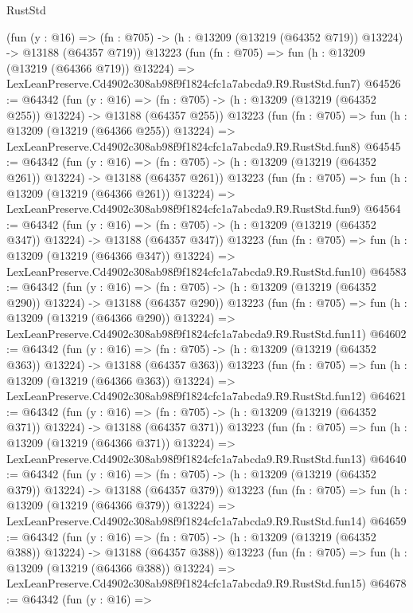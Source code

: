 \begin{lexlean}{RustStd}
\begin{coremodule}
    (fun (y : @16) =>
    (fn : @705) -> (h : @13209 (@13219 (@64352 @719)) @13224) -> @13188 (@64357 @719))
    @13223
    (fun (fn : @705) =>
    fun (h : @13209 (@13219 (@64366 @719)) @13224) =>
    LexLeanPreserve.Cd4902c308ab98f9f1824cfc1a7abcda9.R9.RustStd.fun7)
@64526 := @64342
    (fun (y : @16) =>
    (fn : @705) -> (h : @13209 (@13219 (@64352 @255)) @13224) -> @13188 (@64357 @255))
    @13223
    (fun (fn : @705) =>
    fun (h : @13209 (@13219 (@64366 @255)) @13224) =>
    LexLeanPreserve.Cd4902c308ab98f9f1824cfc1a7abcda9.R9.RustStd.fun8)
@64545 := @64342
    (fun (y : @16) =>
    (fn : @705) -> (h : @13209 (@13219 (@64352 @261)) @13224) -> @13188 (@64357 @261))
    @13223
    (fun (fn : @705) =>
    fun (h : @13209 (@13219 (@64366 @261)) @13224) =>
    LexLeanPreserve.Cd4902c308ab98f9f1824cfc1a7abcda9.R9.RustStd.fun9)
@64564 := @64342
    (fun (y : @16) =>
    (fn : @705) -> (h : @13209 (@13219 (@64352 @347)) @13224) -> @13188 (@64357 @347))
    @13223
    (fun (fn : @705) =>
    fun (h : @13209 (@13219 (@64366 @347)) @13224) =>
    LexLeanPreserve.Cd4902c308ab98f9f1824cfc1a7abcda9.R9.RustStd.fun10)
@64583 := @64342
    (fun (y : @16) =>
    (fn : @705) -> (h : @13209 (@13219 (@64352 @290)) @13224) -> @13188 (@64357 @290))
    @13223
    (fun (fn : @705) =>
    fun (h : @13209 (@13219 (@64366 @290)) @13224) =>
    LexLeanPreserve.Cd4902c308ab98f9f1824cfc1a7abcda9.R9.RustStd.fun11)
@64602 := @64342
    (fun (y : @16) =>
    (fn : @705) -> (h : @13209 (@13219 (@64352 @363)) @13224) -> @13188 (@64357 @363))
    @13223
    (fun (fn : @705) =>
    fun (h : @13209 (@13219 (@64366 @363)) @13224) =>
    LexLeanPreserve.Cd4902c308ab98f9f1824cfc1a7abcda9.R9.RustStd.fun12)
@64621 := @64342
    (fun (y : @16) =>
    (fn : @705) -> (h : @13209 (@13219 (@64352 @371)) @13224) -> @13188 (@64357 @371))
    @13223
    (fun (fn : @705) =>
    fun (h : @13209 (@13219 (@64366 @371)) @13224) =>
    LexLeanPreserve.Cd4902c308ab98f9f1824cfc1a7abcda9.R9.RustStd.fun13)
@64640 := @64342
    (fun (y : @16) =>
    (fn : @705) -> (h : @13209 (@13219 (@64352 @379)) @13224) -> @13188 (@64357 @379))
    @13223
    (fun (fn : @705) =>
    fun (h : @13209 (@13219 (@64366 @379)) @13224) =>
    LexLeanPreserve.Cd4902c308ab98f9f1824cfc1a7abcda9.R9.RustStd.fun14)
@64659 := @64342
    (fun (y : @16) =>
    (fn : @705) -> (h : @13209 (@13219 (@64352 @388)) @13224) -> @13188 (@64357 @388))
    @13223
    (fun (fn : @705) =>
    fun (h : @13209 (@13219 (@64366 @388)) @13224) =>
    LexLeanPreserve.Cd4902c308ab98f9f1824cfc1a7abcda9.R9.RustStd.fun15)
@64678 := @64342
    (fun (y : @16) =>

\end{coremodule}
\end{lexlean}
